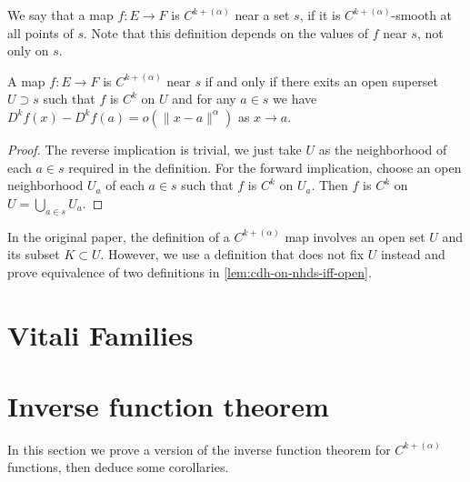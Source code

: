 \begin{definition}%
  \label{def:cdh-near}
  We say that a map \(f\colon E\to F\) is \emph{\(C^{k+(\alpha)}\)} near a set \(s\),
  if it is \(C^{k+(\alpha)}\)-smooth at all points of \(s\).
  Note that this definition depends on the values of \(f\) near \(s\), not only on \(s\).
\end{definition}

\begin{lemma}%
  \label{lem:cdh-on-nhds-iff-open}
  A map \(f\colon E\to F\) is \(C^{k+(\alpha)}\) near \(s\)
  if and only if there exits an open superset \(U\supset s\)
  such that \(f\) is \(C^{k}\) on \(U\)
  and for any \(a \in s\) we have \(D^{k}f(x) - D^{k}f(a) = o(\|x - a\|^{\alpha})\) as \(x\to a\).
\end{lemma}

\begin{proof}
  The reverse implication is trivial, we just take \(U\) as the neighborhood of each \(a \in s\) required in the definition.
  For the forward implication, choose an open neighborhood \(U_{a}\) of each \(a \in s\) such that \(f\) is \(C^{k}\) on \(U_{a}\).
  Then \(f\) is \(C^{k}\) on \(U = \bigcup_{a \in s} U_{a}\).
\end{proof}

\begin{remark}
  In the original paper, the definition of a \(C^{k+(\alpha)}\) map
  involves an open set \(U\) and its subset \(K\subset U\).
  However, we use a definition that does not fix \(U\) instead
  and prove equivalence of two definitions in \autoref{lem:cdh-on-nhds-iff-open}.
\end{remark}

\section{Vitali Families}%
\label{sec:vitali-families}

\section{Inverse function theorem}%
\label{sec:inverse-funct-theor}

In this section we prove a version of the inverse function theorem for \(C^{k+(\alpha)}\) functions,
then deduce some corollaries.

